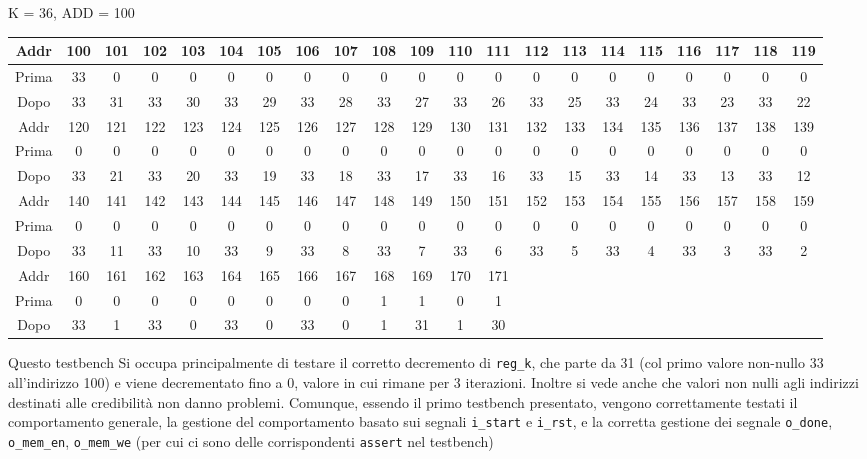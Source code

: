 \documentclass{article}
\begin{document}
K = 36, ADD = 100
\begin{table}[htbp]
    \begin{adjustwidth}{-1.75cm}{}
    \centering
    \begin{tabular}{|c|*{20}{c|}}
        \hline
        Addr & 100 & 101 & 102 & 103 & 104 & 105 & 106 & 107 & 108 & 109 & 110 & 111 & 112 & 113 & 114 & 115 & 116 & 117 & 118 & 119 \\
        \hline
        Prima & 33 & 0 & 0 & 0 & 0 & 0 & 0 & 0 & 0 & 0 & 0 & 0 & 0 & 0 & 0 & 0 & 0 & 0 & 0 & 0 \\
        Dopo & 33 & 31 & 33 & 30 & 33 & 29 & 33 & 28 & 33 & 27 & 33 & 26 & 33 & 25 & 33 & 24 & 33 & 23 & 33 & 22 \\
        \hline
        Addr & 120 & 121 & 122 & 123 & 124 & 125 & 126 & 127 & 128 & 129 & 130 & 131 & 132 & 133 & 134 & 135 & 136 & 137 & 138 & 139 \\
        \hline
        Prima & 0 & 0 & 0 & 0 & 0 & 0 & 0 & 0 & 0 & 0 & 0 & 0 & 0 & 0 & 0 & 0 & 0 & 0 & 0 & 0 \\
        Dopo & 33 & 21 & 33 & 20 & 33 & 19 & 33 & 18 & 33 & 17 & 33 & 16 & 33 & 15 & 33 & 14 & 33 & 13 & 33 & 12 \\
        \hline
        Addr & 140 & 141 & 142 & 143 & 144 & 145 & 146 & 147 & 148 & 149 & 150 & 151 & 152 & 153 & 154 & 155 & 156 & 157 & 158 & 159 \\
        \hline
        Prima & 0 & 0 & 0 & 0 & 0 & 0 & 0 & 0 & 0 & 0 & 0 & 0 & 0 & 0 & 0 & 0 & 0 & 0 & 0 & 0 \\
        Dopo & 33 & 11 & 33 & 10 & 33 & 9 & 33 & 8 & 33 & 7 & 33 & 6 & 33 & 5 & 33 & 4 & 33 & 3 & 33 & 2 \\
        \hline
        Addr & 160 & 161 & 162 & 163 & 164 & 165 & 166 & 167 & 168 & 169 & 170 & 171 & & & & & & & & \\
        \hline
        Prima & 0 & 0 & 0 & 0 & 0 & 0 & 0 & 0 & 1 & 1 & 0 & 1 & & & & & & & & \\
        Dopo & 33 & 1 & 33 & 0 & 33 & 0 & 33 & 0 & 1 & 31 & 1 & 30 & & & & & & & & \\
        \hline
    \end{tabular}
    \end{adjustwidth}
\end{table}

Questo testbench Si occupa principalmente di testare il corretto decremento di \texttt{reg\_k}, che parte da 31 (col primo valore non-nullo 33 all’indirizzo 100) e viene decrementato fino a 0, valore in cui rimane per 3 iterazioni. Inoltre si vede anche che valori non nulli agli indirizzi destinati alle credibilità non danno problemi.
Comunque, essendo il primo testbench presentato, vengono correttamente testati il comportamento generale, la gestione del comportamento basato sui segnali \texttt{i\_start} e \texttt{i\_rst}, e la corretta gestione dei segnale \texttt{o\_done}, \texttt{o\_mem\_en}, \texttt{o\_mem\_we} (per cui ci sono delle corrispondenti \texttt{assert} nel testbench)
\end{document}
